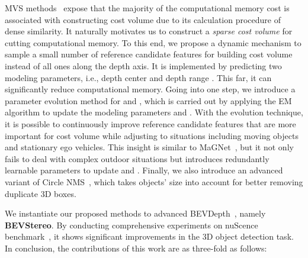 \documentclass[letterpaper]{article} \usepackage[]{aaai23}  \usepackage{times}  \usepackage{helvet}  \usepackage{courier}  \usepackage[hyphens]{url}  \usepackage{graphicx} \urlstyle{rm} \def\UrlFont{\rm}  \usepackage{natbib}  \usepackage{caption} \frenchspacing  \setlength{\pdfpagewidth}{8.5in} \setlength{\pdfpageheight}{11in} \usepackage{algorithm}
\begin{document}
MVS methods~\cite{wang2022monocular, wang2022mv} expose that the majority of the computational memory cost is associated with constructing cost volume due to its calculation procedure of dense similarity. It naturally motivates us to construct a \emph{sparse cost volume} for cutting computational memory. To this end, we propose a dynamic mechanism to sample a small number of reference candidate features for building cost volume instead of all ones along the depth axis. It is implemented by predicting two modeling parameters, i.e., depth center  and depth range . This far, it can significantly reduce computational memory. Going into one step, we introduce a parameter evolution method for  and , which is carried out by applying the EM algorithm to update the modeling parameters  and . With the evolution technique, it is possible to continuously improve reference candidate features that are more important for cost volume while adjusting to situations including moving objects and stationary ego vehicles. This insight is similar to MaGNet~\cite{bae2022multi}, but it not only fails to deal with complex outdoor situations but introduces redundantly learnable parameters to update  and . Finally, we also introduce an advanced variant of Circle NMS~\cite{yin2021center}, which takes objects' size into account for better removing duplicate 3D boxes.












We instantiate our proposed methods to advanced BEVDepth~\cite{li2022bevdepth}, namely \textbf{BEVStereo}. By conducting comprehensive experiments on nuScence benchmark~\cite{caesar2020nuscenes}, it shows significant improvements in the 3D object detection task. In conclusion, the contributions of this work are as three-fold as follows:
\end{document}
